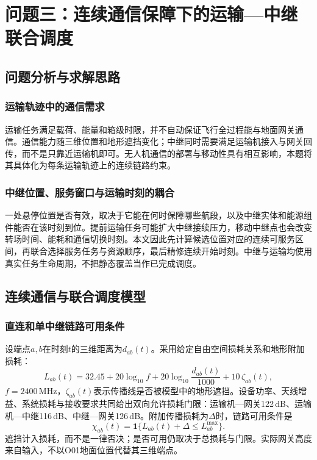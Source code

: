 \section{问题三：连续通信保障下的运输—中继联合调度}
\label{sec:q3}

\subsection{问题分析与求解思路}
\subsubsection{运输轨迹中的通信需求}
运输任务满足载荷、能量和箱级时限，并不自动保证飞行全过程能与地面网关通信。通信能力随三维位置和地形遮挡变化；中继同时需要满足运输机接入与网关回传，而不是只靠近运输机即可。无人机通信的部署与移动性具有相互影响\cite{zeng2016uavcom,zeng2019sky}，本题将其具体化为每条运输轨迹上的连续链路约束。

\subsubsection{中继位置、服务窗口与运输时刻的耦合}
一处悬停位置是否有效，取决于它能在何时保障哪些航段，以及中继实体和能源组件能否在该时刻到位。提前运输任务可能扩大中继接续压力，移动中继点也会改变转场时间、能耗和通信切换时刻。本文因此先计算候选位置对应的连续可服务区间，再联合选择服务任务与资源顺序，最后精修连续开始时刻。中继与运输均使用真实任务生命周期，不把静态覆盖当作已完成调度。

\subsection{连续通信与联合调度模型}
\subsubsection{直连和单中继链路可用条件}
设端点$a,b$在时刻$t$的三维距离为$d_{ab}(t)$。采用给定自由空间损耗关系\cite{iturp525}和地形附加损耗：
\begin{equation}
 L_{ab}(t)=32.45+20\log_{10}f+20\log_{10}\frac{d_{ab}(t)}{1000}
 +10\,\zeta_{ab}(t),
\label{eq:q3_loss}
\end{equation}
$f=2400$\,MHz，$\zeta_{ab}(t)$表示传播线是否被模型中的地形遮挡。设备功率、天线增益、系统损耗与接收要求共同给出双向允许损耗门限：运输机—网关122\,dB、运输机—中继116\,dB、中继—网关126\,dB。附加传播损耗为$\Delta$时，链路可用条件是
\begin{equation}
 \chi_{ab}(t)=\mathbf1\{L_{ab}(t)+\Delta\le L_{ab}^{\max}\}.
\label{eq:q3_link}
\end{equation}
遮挡计入损耗，而不是一律否决；是否可用仍取决于总损耗与门限。实际网关高度来自输入，不以O01地面位置代替其三维端点。

